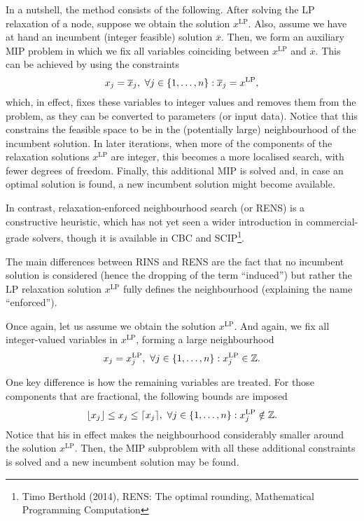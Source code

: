 In a nutshell, the method consists of the following. After solving the LP relaxation of a node, suppose we obtain the solution $x^{\text{LP}}$. Also, assume we have at hand an incumbent (integer feasible) solution $\overline{x}$. Then, we form an auxiliary MIP problem in which we fix all variables coinciding between $x^{\text{LP}}$ and $\overline{x}$. This can be achieved by using the constraints
	\begin{equation*}
		x_j = \overline{x}_j, \ \forall j \in \left\{ 1,\dots,n \right \} : \overline{x}_j = x^\text{LP},	
	\end{equation*}
	which, in effect, fixes these variables to integer values and removes them from the problem, as they can be converted to parameters (or input data). Notice that this constrains the feasible space to be in the (potentially large) neighbourhood of the incumbent solution. In later iterations, when more of the components of the relaxation solutions $x^{\text{LP}}$ are integer, this becomes a more localised search, with fewer degrees of freedom. Finally, this additional MIP is solved and, in case an optimal solution is found, a new incumbent solution might become available.

In contrast, relaxation-enforced neighbourhood search (or RENS) is a constructive heuristic, which has not yet seen a wider introduction in commercial-grade solvers, though it is available in   CBC and SCIP\footnote{Timo Berthold (2014), RENS: The optimal rounding, Mathematical Programming Computation}.
 
The main differences between RINS and RENS are the fact that no incumbent solution is considered (hence the dropping of the term ``induced'') but rather the LP relaxation solution $x^{\text{LP}}$ fully defines the neighbourhood (explaining the name ``enforced'').
 
Once again, let us assume we obtain the solution $x^{\text{LP}}$. And again, we fix all integer-valued variables in $x^{\text{LP}}$, forming a large neighbourhood
%
\begin{equation*}
	x_j = x_j^{\text{LP}}, \ \forall j \in \left\{ 1,\dots,n \right \} : x_j^{\text{LP}} \in \mathbb{Z}.
\end{equation*}
%

One key difference is how the remaining variables are treated. For those components that are fractional, the following bounds are imposed
%
\begin{equation*}
	\lfloor x_j \rfloor \leq x_j \leq \lceil x_j \rceil, \ \forall j \in \left\{ 1,\dots,n \right \} : x_j^{\text{LP}} \notin \mathbb{Z}.
\end{equation*}
%
Notice that his in effect makes the neighbourhood considerably smaller around the solution $x^{\text{LP}}$. Then, the MIP subproblem with all these additional constraints is solved and a new incumbent solution may be found. 

